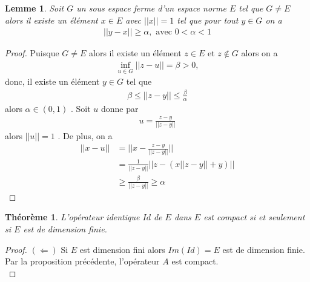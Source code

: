 \documentclass{report}
\newtheorem{The}{Théorème}[subsection]
\newtheorem{Lem}{Lemme}[subsection]
\begin{document}
{\begin{Lem} \label{Lem:300} Soit $G$ un sous espace ferme d'un espace norme $E$ tel que $G \neq E$ alors il existe un élément $x \in E$ avec $||x|| = 1$ tel que pour tout $y \in G$ on a 
									\begin{align*}
								 ||y - x|| \ge \alpha ,    \,\,\text{avec}\,\, 0 < \alpha < 1 
									\end{align*}
\end{Lem}
\begin{proof}
Puisque $G \neq E$ alors il existe un élément $z \in E$ et $z \notin G$ alors on a 
									\begin{align*}
								 \inf_{u\in G} ||z-u|| = \beta > 0 , 
									\end{align*}
donc, il existe un élément $y \in G$ tel que 
									\begin{align*}
								 \beta \le ||z- y|| \le \frac{\beta}{\alpha} 
									\end{align*}
alors $\alpha \in (0,1)$ . Soit $u$ donne par 
									\begin{align*}
								 u = \frac{z-y}{||z-y||} 
									\end{align*}
alors $||u|| = 1$ . De plus, on a 
									\begin{align*}
								 ||x - u|| &= ||x - \frac{z-y}{||z-y||}|| \\
								 &= \frac{1}{||z-y||} || z - (x||z-y|| + y) || \\
								 &\ge \frac{\beta}{||z-y||} \ge \alpha 
									\end{align*}
\end{proof}





\begin{The} \label{The:400} L'opérateur identique $Id$ de $E$ dans $E$ est compact si et seulement si $E$ est de dimension finie.\\
\end{The}
\begin{proof}
 \hbox{$(\Leftarrow)$} Si $E$ est dimension fini alors $Im(Id) = E$ est de dimension finie. Par la proposition précédente, l'opérateur $A$ est compact.\\


\end{proof}}
\end{document}
